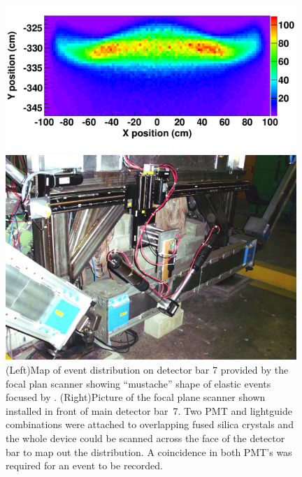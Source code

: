 \begin{figure}[h]
\begin{minipage}{0.45\textwidth}
\centering
\includegraphics[width=0.98\textwidth]{Pictures/plot_ratemap.pdf}
\end{minipage}
\begin{minipage}{0.55\textwidth}
\centering
\includegraphics[width=0.98\textwidth]{Pictures/scanner.png}
\end{minipage}
\caption{(Left)Map of event distribution on detector bar 7 provided by the focal plan scanner showing ``mustache'' shape of elastic events focused by \qtor. (Right)Picture of the focal plane scanner shown installed in front of main detector bar~7. Two PMT and lightguide combinations were attached to overlapping fused silica crystals and the whole device could be scanned across the face of the detector bar to map out the distribution. A coincidence in both PMT's was required for an event to be recorded.}
\label{fig:scanner}
\end{figure}


